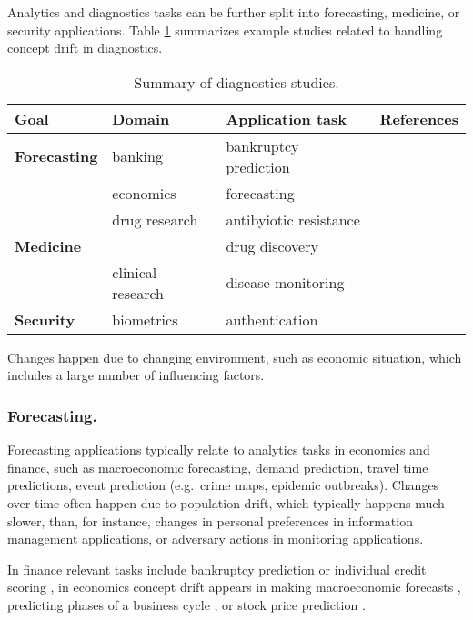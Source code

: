 \documentclass{llncs}
\begin{document}
Analytics and diagnostics tasks can be further split into forecasting, medicine, or security applications.
Table \ref{tab:diagnostics} summarizes example studies related to handling concept drift  in diagnostics.
\begin{table}[t]
\caption{Summary of diagnostics studies.}
\centering
\begin{tabular}{|llll|}
\hline
\textbf{Goal} & \textbf{Domain} & \textbf{Application task} & \textbf{References}\\
\hline
\textbf{Forecasting} & banking & bankruptcy prediction & \cite{Sung99,Horta09} \\
& economics & forecasting & \cite{Giacomini06,Klinkenberg05,Harries95} \\
\hline
			& drug research & antibyiotic resistance & \cite{Tsymbal08,Jermaine08,Martin12} \\
\textbf{Medicine}&			 & drug discovery & \cite{Forman02} \\
			 & clinical research & disease monitoring &  \cite{Kukar03,Gago07,Black04} \\
\hline
\textbf{Security}& biometrics & authentication & \cite{Yampolskiy07,Poh09} \\
\hline
\end{tabular}
\label{tab:diagnostics}
\end{table}

Changes happen due to changing environment, such as economic situation, which includes a large number of influencing factors.

\subsubsection{Forecasting.}

Forecasting applications typically relate to analytics tasks in economics and finance, such as macroeconomic forecasting,
demand prediction, travel time predictions, event prediction (e.g.\ crime maps, epidemic outbreaks).
Changes over time often happen due to population drift, which typically happens much slower,
than, for instance, changes in personal preferences in information management applications, or adversary actions in monitoring applications.

In finance relevant tasks include bankruptcy prediction or individual credit scoring \cite{Sung99,Horta09},
in economics concept drift appears in making macroeconomic forecasts \cite{Giacomini06},
predicting phases of a business cycle \cite{Klinkenberg05}, or stock price prediction \cite{Harries95}.
\end{document}

